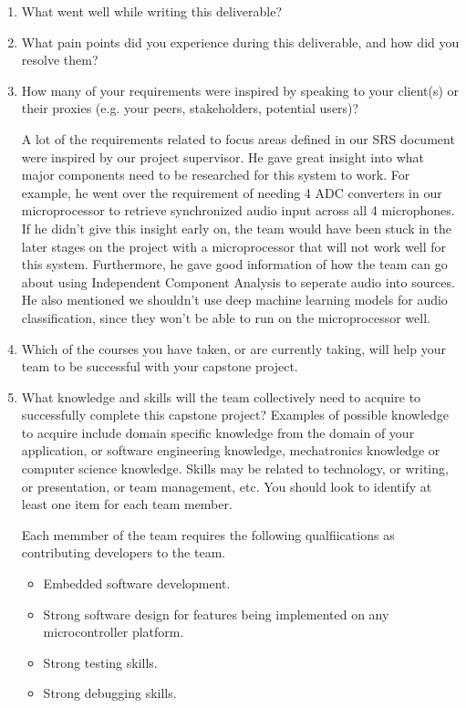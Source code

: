 \begin{enumerate}
  \item What went well while writing this deliverable? 
  \item What pain points did you experience during this deliverable, and how did
  you resolve them?
  \item How many of your requirements were inspired by speaking to your
  client(s) or their proxies (e.g. your peers, stakeholders, potential users)?

  A lot of the requirements related to focus areas defined in our SRS document 
  were inspired by our project supervisor. He gave great insight into what major
  components need to be researched for this system to work. For example, he went 
  over the requirement of needing 4 ADC converters in our microprocessor to 
  retrieve synchronized audio input across all 4 microphones. If he didn't give 
  this insight early on, the team would have been stuck in the later stages on 
  the project with a microprocessor that will not work well for this system. 
  Furthermore, he gave good information of how the team can go about using 
  Independent Component Analysis to seperate audio into sources. He also 
  mentioned we shouldn't use deep machine learning models for audio 
  classification, since they won't be able to run on the microprocessor well. 

  
  \item Which of the courses you have taken, or are currently taking, will help
  your team to be successful with your capstone project.

  \item What knowledge and skills will the team collectively need to acquire to
  successfully complete this capstone project?  Examples of possible knowledge
  to acquire include domain specific knowledge from the domain of your
  application, or software engineering knowledge, mechatronics knowledge or
  computer science knowledge.  Skills may be related to technology, or writing,
  or presentation, or team management, etc.  You should look to identify at
  least one item for each team member.

  Each memmber of the team requires the following qualfiications as contributing
   developers to the team.

  \begin{itemize}
    \item Embedded software development.
    \item Strong software design for features being implemented on any 
    microcontroller platform. 
    \item Strong testing skills.
    \item Strong debugging skills. 
  \end{itemize}


\end{enumerate}
